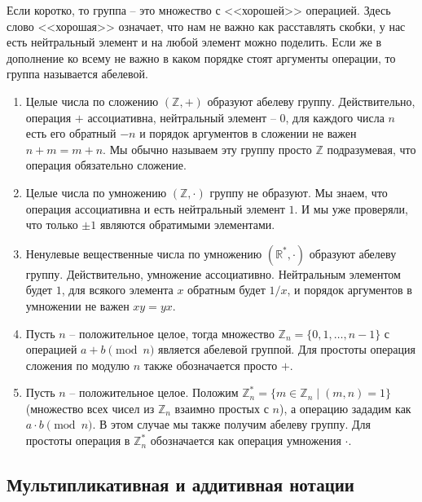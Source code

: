 Если коротко, то группа -- это множество с <<хорошей>> операцией.
Здесь слово <<хорошая>> означает, что нам не важно как расставлять скобки, у нас есть нейтральный элемент и на любой элемент можно поделить.
Если же в дополнение ко всему не важно в каком порядке стоят аргументы операции, то группа называется абелевой.

\begin{examples}
\begin{enumerate}
\item Целые числа по сложению $(\mathbb Z, +)$ образуют абелеву группу.
Действительно, операция $+$ ассоциативна, нейтральный элемент -- $0$, для каждого числа $n$ есть его обратный $-n$ и порядок аргументов в сложении не важен $n + m = m + n$.
Мы обычно называем эту группу просто $\mathbb Z$ подразумевая, что операция обязательно сложение.

\item Целые числа по умножению $(\mathbb Z, \cdot)$ группу не образуют.
Мы знаем, что операция ассоциативна и есть нейтральный элемент $1$.
И мы уже проверяли, что только $\pm 1$ являются обратимыми элементами.

\item Ненулевые вещественные числа по умножению $(\mathbb  R^*, \cdot)$ образуют абелеву группу.
Действительно, умножение ассоциативно.
Нейтральным элементом будет $1$, для всякого элемента $x$ обратным будет $1/x$, и порядок аргументов в умножении не важен $xy = yx$.

\item Пусть $n$ -- положительное целое, тогда множество $\mathbb Z_n = \{0,1, \ldots, n-1\}$ с операцией $a + b \pmod n$ является абелевой группой.
Для простоты операция сложения по модулю $n$ также обозначается просто $+$.

\item Пусть $n$ -- положительное целое.
Положим $\mathbb Z_n^* = \{m\in \mathbb Z_n \mid (m,n) = 1\}$ (множество всех чисел из $\mathbb Z_n$ взаимно простых с $n$), а операцию зададим как $a \cdot b \pmod n$.
В этом случае мы также получим абелеву группу.
Для простоты операция в $\mathbb Z_n^*$ обозначается как операция умножения $\cdot$.

\end{enumerate}
\end{examples}

\subsection{Мультипликативная и аддитивная нотации}

